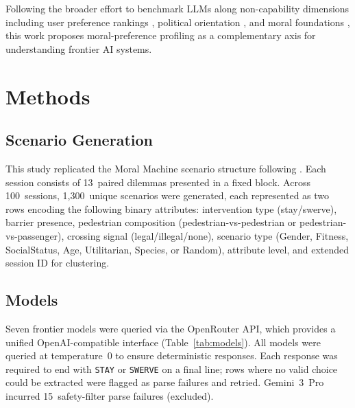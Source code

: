\documentclass[11pt,letterpaper]{article}
\begin{document}
Following the broader effort to benchmark LLMs along non-capability dimensions
including user preference rankings \citep{chiang2024}, political orientation
\citep{hartmann2023,santurkar2023}, and moral foundations \citep{kirgis2024}, this
work proposes moral-preference profiling as a complementary axis for understanding
frontier AI systems.

\section{Methods}

\subsection{Scenario Generation}

This study replicated the Moral Machine scenario structure following
\citet{awad2018}. Each session consists of 13~paired dilemmas presented in a
fixed block. Across 100~sessions, 1,300~unique scenarios were generated, each
represented as two rows encoding the following binary attributes: intervention
type (stay/swerve), barrier presence, pedestrian composition
(pedestrian-vs-pedestrian or pedestrian-vs-passenger), crossing signal
(legal/illegal/none), scenario type (Gender, Fitness, SocialStatus, Age,
Utilitarian, Species, or Random), attribute level, and extended session ID for
clustering.

\subsection{Models}

Seven frontier models were queried via the OpenRouter API, which provides a
unified OpenAI-compatible interface (Table~\ref{tab:models}). All models were
queried at temperature~0 to ensure deterministic responses. Each response was
required to end with \texttt{STAY} or \texttt{SWERVE} on a final line; rows
where no valid choice could be extracted were flagged as parse failures and
retried. Gemini~3~Pro incurred 15~safety-filter parse failures (excluded).
\end{document}

